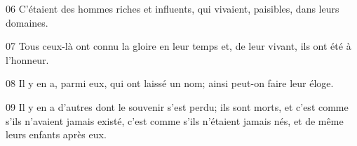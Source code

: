 
06 C’étaient des hommes riches et influents, qui vivaient, paisibles, dans leurs domaines.

07 Tous ceux-là ont connu la gloire en leur temps et, de leur vivant, ils ont été à l’honneur.

08 Il y en a, parmi eux, qui ont laissé un nom; ainsi peut-on faire leur éloge.

09 Il y en a d’autres dont le souvenir s’est perdu; ils sont morts, et c’est comme s’ils n’avaient jamais existé, c’est comme s’ils n’étaient jamais nés, et de même leurs enfants après eux.
